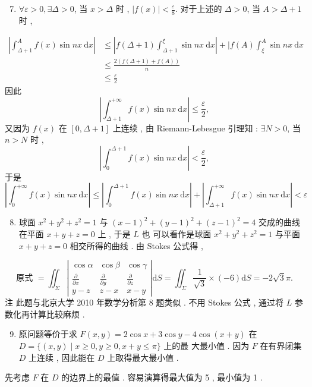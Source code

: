 \documentclass[10pt]{article}
\begin{document}
\begin{enumerate}
  \setcounter{enumi}{6}
  \item $\forall \varepsilon>0, \exists \Delta>0$,  当  $x>\Delta$  时 , $|f(x)|<\frac{\varepsilon}{8}$.  对于上述的  $\Delta>0$,  当  $A>\Delta+1$  时 ,
\end{enumerate}
$$
\begin{aligned}
\left|\int_{\Delta+1}^{A} f(x) \sin n x \mathrm{~d} x\right| & \leqslant\left|f(\Delta+1) \int_{\Delta+1}^{\xi} \sin n x \mathrm{~d} x\right|+\mid f(A) \int_{\xi}^{A} \sin n x \mathrm{~d} x \\
& \leqslant \frac{2(f(\Delta+1)+f(A))}{n} \\
& \leqslant \frac{\varepsilon}{2}
\end{aligned}
$$
 因此 
$$
\left|\int_{\Delta+1}^{+\infty} f(x) \sin n x \mathrm{~d} x\right| \leqslant \frac{\varepsilon}{2},
$$
 又因为  $f(x)$  在  $[0, \Delta+1]$  上连续 ,  由  Riemann-Lebesgue  引理知 : $\exists N>0$,  当  $n>N$  时 ,
$$
\left|\int_{0}^{\Delta+1} f(x) \sin n x \mathrm{~d} x\right|<\frac{\varepsilon}{2},
$$
 于是 
$$
\left|\int_{0}^{+\infty} f(x) \sin n x \mathrm{~d} x\right| \leqslant\left|\int_{0}^{\Delta+1} f(x) \sin n x \mathrm{~d} x\right|+\left|\int_{\Delta+1}^{+\infty} f(x) \sin n x \mathrm{~d} x\right|<\varepsilon
$$

\begin{enumerate}
  \setcounter{enumi}{7}
  \item  球面  $x^{2}+y^{2}+z^{2}=1$  与  $(x-1)^{2}+(y-1)^{2}+(z-1)^{2}=4$  交成的曲线在平面  $x+y+z=0$  上 ,  于是  $L$  也   可以看作是球面  $x^{2}+y^{2}+z^{2}=1$  与平面  $x+y+z=0$  相交所得的曲线 .  由  Stokes  公式得 ,
\end{enumerate}
$$
\text { 原式 }=\iint_{\Sigma}\left|\begin{array}{ccc}
\cos \alpha & \cos \beta & \cos \gamma \\
\frac{\partial}{\partial x} & \frac{\partial}{\partial y} & \frac{\partial}{\partial z} \\
y-z & z-x & x-y
\end{array}\right| \mathrm{d} S=\iint_{\Sigma} \frac{1}{\sqrt{3}} \times(-6) \mathrm{d} S=-2 \sqrt{3} \pi \text {. }
$$
 注   此题与北京大学  2010  年数学分析第  8  题类似 .  不用  Stokes  公式 ,  通过将  $L$  参数化再计算比较麻烦 .

\begin{enumerate}
  \setcounter{enumi}{8}
  \item  原问题等价于求  $F(x, y)=2 \cos x+3 \cos y-4 \cos (x+y)$  在  $D=\{(x, y) \mid x \geqslant 0, y \geqslant 0, x+y \leqslant \pi\}$  上的最   大最小值 .  因为  $F$  在有界闭集  $D$  上连续 ,  因此能在  $D$  上取得最大最小值 .
\end{enumerate}
 先考虑  $F$  在  $D$  的边界上的最值 .  容易演算得最大值为  5 ,  最小值为  1 .
\end{document}
